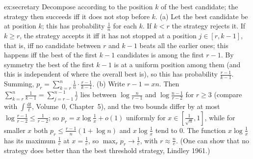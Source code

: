\begin{solution}{ex:secretary}
\idea Decompose according to the position $k$ of the best candidate; the strategy then succeeds iff it does not
stop before $k$.
\writeup (a) Let the best candidate be at position $k$; this has probability $\frac1n$ for each $k$. If $k<r$ the
strategy rejects it. If $k\ge r$, the strategy accepts it iff it has not stopped at a position $j\in[r,k-1]$, that
is, iff no candidate between $r$ and $k-1$ beats all the earlier ones; this happens iff the best of the first $k-1$
candidates is among the first $r-1$. By symmetry the best of the first $k-1$ is at a uniform position among
them (and this is independent of where the overall best is), so this has probability $\frac{r-1}{k-1}$. Summing,
$p_r=\sum_{k=r}^n\frac1n\cdot\frac{r-1}{k-1}$.
(b) Write $r-1=xn$. Then $\sum_{k=r}^n\frac1{k-1}=\sum_{j=r-1}^{n-1}\frac1j$ lies between $\log\frac n{r-1}$ and
$\log\frac{n-1}{r-2}$ for $r\ge3$ (compare with $\int\frac{\mathrm dt}t$, Volume~0, Chapter~5), and the two bounds differ by at most $\log\frac{r-1}{r-2}\le\frac1{r-2}$; so $p_r=x\log\frac1x+o(1)$
uniformly for $x\in[\frac1{\sqrt n},1]$, while for smaller $x$ both $p_r\le\frac{r-1}n(1+\log n)$ and
$x\log\frac1x$ tend to $0$. The function $x\log\frac1x$ has its maximum $\frac1e$ at $x=\frac1e$, so
$\max_rp_r\to\frac1e$, with $r\approx\frac ne$. (One can show that no strategy does better than the best threshold
strategy, Lindley 1961.)
\end{solution}

